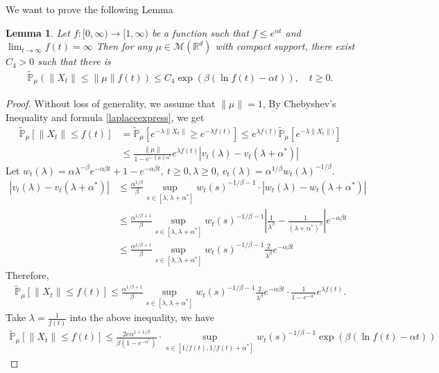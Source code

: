 \documentclass[12pt, a4paper]{amsart}
\newtheorem{lem}[thm]{Lemma}
\theoremstyle{definition}
\numberwithin{equation}{section}
\begin{document}
We want to prove the following Lemma
\begin{lem}\label{lemma2_13}
Let $f:[0,\infty)\rightarrow[1,\infty)$ be a function such that $f\leq e^{\alpha t}$ and $\lim_{t\rightarrow \infty}f(t)=\infty$ Then for any $\mu\in \mathcal M(\mathbb R^d)$ with compact support, there exist $C_4>0$ such that there is
\begin{align}
    \mathbb{\tilde{P}}_{\mu}(\|X_t\|\leq \|\mu\|f(t))\leq C_4 \exp(\beta(\ln f(t)-\alpha t)), \quad t\geq 0.
\end{align}
\end{lem}
\begin{proof}
 Without loss of generality, we assume that $\|\mu\|=1$, By Chebyshev's Inequality and formula \eqref{laplaceexpress}, we get
\begin{align*}
    \mathbb{\tilde{P}}_{\mu}[\|X_t\|\leq f(t)]&=\mathbb{\tilde{P}}_{\mu}[e^{-\lambda\|X_t\|}\geq e^{-\lambda f(t)}]\leq e^{\lambda f(t)}\mathbb{\tilde{P}}_{\mu}[e^{-\lambda \|X_t\|)}]\\
    &\leq \frac{\|\mu\|}{1-e^{-\|\mu\|\alpha^*}}e^{\lambda f(t)}\left|v_t(\lambda)-v_t(\lambda+\alpha^*)\right|
\end{align*}
Let $w_t(\lambda)=\alpha \lambda^{-\beta}e^{-\alpha \beta t}+1-e^{-\alpha\beta t},~ t\geq 0,\lambda\geq0$, $v_t(\lambda)=\alpha^{1/\beta}w_t(\lambda)^{-1/\beta}$.
\begin{align*}
    \left|v_t(\lambda)-v_t(\lambda+\alpha^*)\right|&\leq\frac {\alpha^{1/\beta}}{\beta}\sup_{s\in [\lambda,\lambda+\alpha^*]}w_t(s)^{-1/\beta-1}\cdot\left|w_t(\lambda)-w_t(\lambda+\alpha^*)\right|\\
    &\leq  \frac{\alpha^{1/\beta+1}}{\beta}\sup_{s\in [\lambda,\lambda+\alpha^*]}w_t(s)^{-1/\beta-1}\left|\frac{1}{\lambda^{\beta}}-\frac{1}{(\lambda+\alpha^*)^{\beta}}\right|e^{-\alpha\beta t}\\
    &\leq  \frac{\alpha^{1/\beta+1}}{\beta}\sup_{s\in [\lambda,\lambda+\alpha^*]}w_t(s)^{-1/\beta-1}\frac{2}{\lambda^{\beta}}e^{-\alpha\beta t}
\end{align*}
Therefore,
\begin{align*}
    \mathbb{\tilde{P}}_{\mu}[\|X_t\|\leq f(t)]\leq \frac{\alpha^{1/\beta+1}}{\beta}\sup_{s\in [\lambda,\lambda+\alpha^*]}w_t(s)^{-1/\beta-1}\frac{2}{\lambda^{\beta}}e^{-\alpha\beta t}\cdot \frac{1}{1-e^{-\alpha^*}} e^{\lambda f(t)}.
\end{align*}
Take $\lambda=\frac{1}{f(t)}$ into the above inequality, we have
\begin{align*}
    \mathbb{\tilde{P}}_{\mu}[\|X_t\|\leq f(t)]\leq \frac{2 e \alpha^{1+1/\beta}}{\beta (1-e^{-\alpha^*})}\cdot\sup_{s\in [1/f(t),1/f(t)+\alpha^*]}w_t(s)^{-1/\beta-1}\exp(\beta(\ln f(t)-\alpha t))

\end{align*}
\end{proof}
\end{document}
